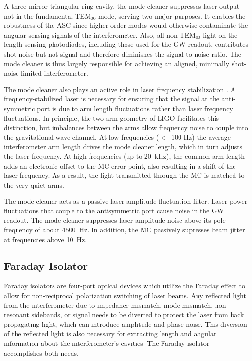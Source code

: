 A three-mirror triangular ring cavity, the mode cleaner suppresses laser output not in
the fundamental TEM$_{00}$ mode, serving two major purposes. It enables the robustness of the
ASC since higher order modes would otherwise contaminate the angular sensing
signals of the interferometer. Also, all non-TEM$_{00}$ light on the
length sensing photodiodes, including those used for the GW readout,
contributes shot noise but not signal and therefore diminishes the signal to
noise ratio. The mode cleaner is thus largely responsible for achieving an aligned,
minimally shot-noise-limited interferometer. 

The mode cleaner also plays an active role in laser frequency
stabilization \citep{Zucker2002H1}. A frequency-stabilized laser is
necessary for ensuring that the signal at the anti-symmetric port is
due to arm length fluctuations rather than laser frequency
fluctuations. In principle, the two-arm geometry of LIGO facilitates
this distinction, but imbalances between the arms allow frequency
noise to couple into the gravitational wave channel. At low
frequencies ($<$~100 Hz) the average interferometer arm length drives
the mode cleaner length, which in turn adjusts the laser frequency. At
high frequencies (up to 20~kHz), the common arm length adds an
electronic offset to the MC error point, also resulting in a shift of
the laser frequency. As a result, the light transmitted through the MC
is matched to the very quiet arms.
 
The mode cleaner acts as a passive laser amplitude fluctuation
filter. Laser power fluctuations that couple to the antisymmetric port
cause noise in the GW readout.  The mode cleaner suppresses laser
amplitude noise above its pole frequency of about 4500~Hz. In
addition, the MC passively supresses beam jitter at frequencies above
10~Hz.


\subsection{Faraday Isolator}
Faraday isolators are four-port optical devices which utilize the
Faraday effect to allow for non-reciprocal polarization switching of
laser beams.  Any reflected light from the interferometer due to
impedance mismatch, mode mismatch, non-resonant sidebands, or signal
needs to be diverted to protect the laser from back propagating light,
which can introduce amplitude and phase noise.  This diversion of the
reflected light is also necessary for extracting length and angular
information about the interferometer's cavities. The Faraday isolator
accomplishes both needs.


